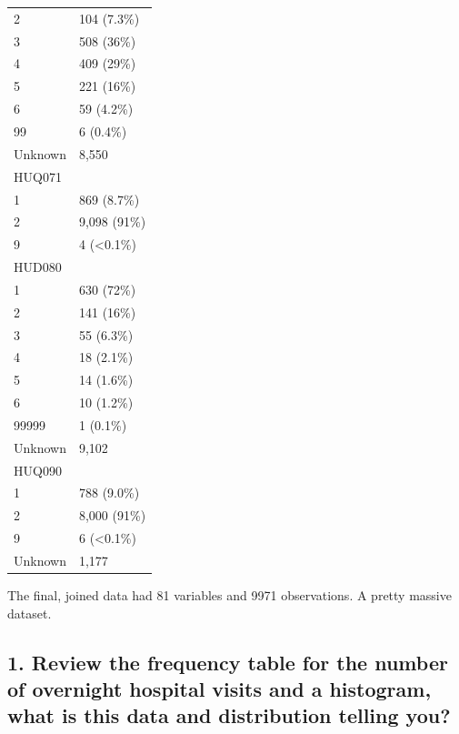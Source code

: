 \documentclass[]{article}
\begin{document}
\begin{longtable}[]{@{}ll@{}}
2 & 104 (7.3\%)\tabularnewline
3 & 508 (36\%)\tabularnewline
4 & 409 (29\%)\tabularnewline
5 & 221 (16\%)\tabularnewline
6 & 59 (4.2\%)\tabularnewline
99 & 6 (0.4\%)\tabularnewline
Unknown & 8,550\tabularnewline
HUQ071 &\tabularnewline
1 & 869 (8.7\%)\tabularnewline
2 & 9,098 (91\%)\tabularnewline
9 & 4 (\textless{}0.1\%)\tabularnewline
HUD080 &\tabularnewline
1 & 630 (72\%)\tabularnewline
2 & 141 (16\%)\tabularnewline
3 & 55 (6.3\%)\tabularnewline
4 & 18 (2.1\%)\tabularnewline
5 & 14 (1.6\%)\tabularnewline
6 & 10 (1.2\%)\tabularnewline
99999 & 1 (0.1\%)\tabularnewline
Unknown & 9,102\tabularnewline
HUQ090 &\tabularnewline
1 & 788 (9.0\%)\tabularnewline
2 & 8,000 (91\%)\tabularnewline
9 & 6 (\textless{}0.1\%)\tabularnewline
Unknown & 1,177\tabularnewline
\bottomrule
\end{longtable}

The final, joined data had 81 variables and 9971 observations. A pretty
massive dataset.

\hypertarget{review-the-frequency-table-for-the-number-of-overnight-hospital-visits-and-a-histogram-what-is-this-data-and-distribution-telling-you}{%
\subsection{1. Review the frequency table for the number of overnight
hospital visits and a histogram, what is this data and distribution
telling
you?}\label{review-the-frequency-table-for-the-number-of-overnight-hospital-visits-and-a-histogram-what-is-this-data-and-distribution-telling-you}}
\end{document}
